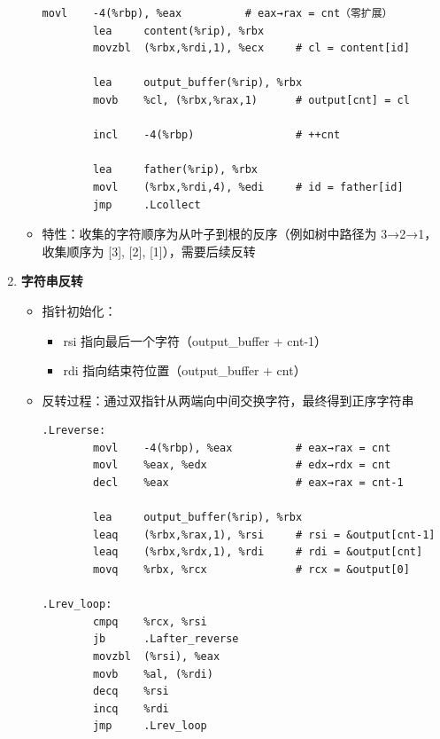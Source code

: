 \documentclass[10pt,a4paper]{article}
\begin{document}
\begin{enumerate}
\begin{itemize}
\begin{lstlisting}[language={[x86masm]Assembler}]
        movl    -4(%rbp), %eax          # eax→rax = cnt（零扩展）
        lea     content(%rip), %rbx
        movzbl  (%rbx,%rdi,1), %ecx     # cl = content[id]

        lea     output_buffer(%rip), %rbx
        movb    %cl, (%rbx,%rax,1)      # output[cnt] = cl

        incl    -4(%rbp)                # ++cnt

        lea     father(%rip), %rbx
        movl    (%rbx,%rdi,4), %edi     # id = father[id]
        jmp     .Lcollect
        \end{lstlisting}
        \item 特性：收集的字符顺序为从叶子到根的反序（例如树中路径为 3→2→1，收集顺序为 [3], [2], [1]），需要后续反转
    \end{itemize}
    
    \item \textbf{字符串反转}
    \begin{itemize}
        \item 指针初始化：
        \begin{itemize}
            \item rsi 指向最后一个字符（output\_buffer + cnt-1）
            \item rdi 指向结束符位置（output\_buffer + cnt）
        \end{itemize}
        \item 反转过程：通过双指针从两端向中间交换字符，最终得到正序字符串
        \begin{lstlisting}[language={[x86masm]Assembler}]
.Lreverse:
        movl    -4(%rbp), %eax          # eax→rax = cnt
        movl    %eax, %edx              # edx→rdx = cnt
        decl    %eax                    # eax→rax = cnt-1

        lea     output_buffer(%rip), %rbx
        leaq    (%rbx,%rax,1), %rsi     # rsi = &output[cnt-1]
        leaq    (%rbx,%rdx,1), %rdi     # rdi = &output[cnt]
        movq    %rbx, %rcx              # rcx = &output[0]

.Lrev_loop:
        cmpq    %rcx, %rsi
        jb      .Lafter_reverse
        movzbl  (%rsi), %eax
        movb    %al, (%rdi)
        decq    %rsi
        incq    %rdi
        jmp     .Lrev_loop
        \end{lstlisting}
    \end{itemize}
    

\end{enumerate}
\end{document}
